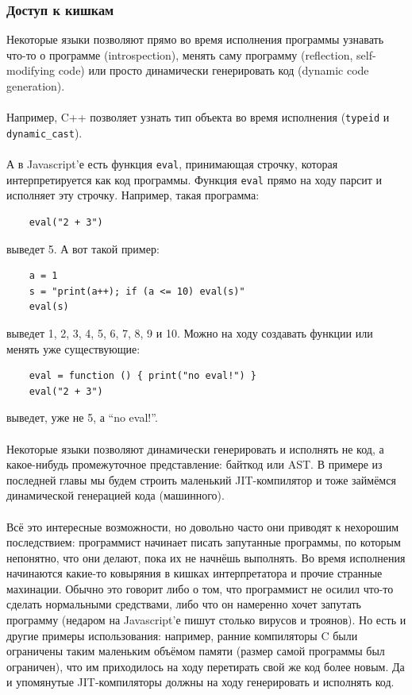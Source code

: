 \documentclass[11pt]{book}
\begin{document}
\subsubsection{Доступ к кишкам}
Некоторые языки позволяют прямо во время исполнения программы
узнавать что-то о программе (introspection),
менять саму программу (reflection, self-modifying code)
или просто динамически генерировать код (dynamic code generation).
\\ \\
Например, C++ позволяет узнать тип объекта во время исполнения (\texttt{typeid} и \texttt{dynamic\_cast}).
\\ \\
А в Javascript'е есть функция \texttt{eval}, принимающая строчку, которая интерпретируется как код программы.
Функция \texttt{eval} прямо на ходу парсит и исполняет эту строчку.
Например, такая программа:
\begin{verbatim}
    eval("2 + 3")
\end{verbatim}
выведет 5. А вот такой пример:
\begin{verbatim}
    a = 1
    s = "print(a++); if (a <= 10) eval(s)"
    eval(s)
\end{verbatim}
выведет 1, 2, 3, 4, 5, 6, 7, 8, 9 и 10.
Можно на ходу создавать функции или менять уже существующие:
\begin{verbatim}
    eval = function () { print("no eval!") }
    eval("2 + 3")
\end{verbatim}
выведет, уже не 5, а ``no eval!''.
\\ \\
Некоторые языки позволяют динамически генерировать и исполнять не код, а какое-нибудь промежуточное представление: байткод или AST.
В примере из последней главы мы будем строить маленький JIT-компилятор
и тоже займёмся динамической генерацией кода (машинного).
\\ \\
Всё это интересные возможности, но довольно часто они приводят к нехорошим последствием:
программист начинает писать запутанные программы, по которым непонятно, что они делают, пока их не начнёшь выполнять.
Во время исполнения начинаются какие-то ковыряния в кишках интерпретатора и прочие странные махинации.
Обычно это говорит либо о том, что программист не осилил что-то сделать нормальными средствами,
либо что он намеренно хочет запутать программу (недаром на Javascript'е пишут столько вирусов и троянов).
Но есть и другие примеры использования: например, ранние компиляторы C были ограничены таким маленьким объёмом памяти
(размер самой программы был ограничен), что им приходилось на ходу перетирать свой же код более новым.
Да и упомянутые JIT-компиляторы должны на ходу генерировать и исполнять код.
\end{document}
